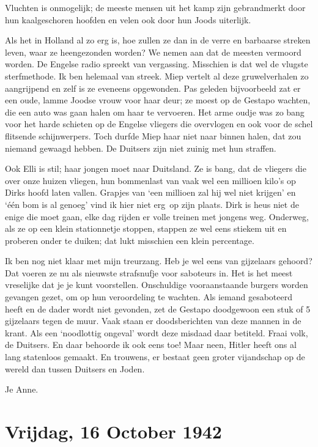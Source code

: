 \documentclass{book}
\begin{document}
Vluchten is onmogelijk; de meeste mensen uit het kamp zijn gebrandmerkt door hun
kaalgeschoren hoofden en velen ook door hun Joods uiterlijk.

Als het in Holland al zo erg is, hoe zullen ze dan in de verre en barbaarse
streken leven, waar ze heengezonden worden? We nemen aan dat de meesten vermoord
worden. De Engelse radio spreekt van vergassing.  Misschien is dat wel de
vlugste sterfmethode. Ik ben helemaal van streek. Miep vertelt al deze
gruwelverhalen zo aangrijpend en zelf is ze eveneens opgewonden. Pas geleden
bijvoorbeeld zat er een oude, lamme Joodse vrouw voor haar deur; ze moest op de
Gestapo wachten, die een auto was gaan halen om haar te vervoeren. Het arme
oudje was zo bang voor het harde schieten op de Engelse vliegers die overvlogen
en ook voor de schel flitsende schijnwerpers. Toch durfde Miep haar niet naar
binnen halen, dat zou niemand gewaagd hebben. De Duitsers zijn niet zuinig met
hun straffen.

Ook Elli is stil; haar jongen moet naar Duitsland. Ze is bang, dat de vliegers
die over onze huizen vliegen, hun bommenlast van vaak wel een millioen kilo's op
Dirks hoofd laten vallen. Grapjes van `een millioen zal hij wel niet krijgen' en
`één bom is al genoeg' vind ik hier niet erg~op zijn plaats. Dirk is heus niet
de enige die moet gaan, elke dag rijden er volle treinen met jongens weg.
Onderweg, als ze op een klein stationnetje stoppen, stappen ze wel eens stiekem
uit en proberen onder te duiken; dat lukt misschien een klein percentage.

Ik ben nog niet klaar met mijn treurzang. Heb je wel eens van gijzelaars
gehoord? Dat voeren ze nu als nieuwste strafsnufje voor saboteurs in.  Het is
het meest vreselijke dat je je kunt voorstellen. Onschuldige vooraanstaande
burgers worden gevangen gezet, om op hun veroordeling te wachten. Als iemand
gesaboteerd heeft en de dader wordt niet gevonden, zet de Gestapo doodgewoon een
stuk of 5 gijzelaars tegen de muur. Vaak staan er doodsberichten van deze mannen
in de krant. Als een `noodlottig ongeval' wordt deze misdaad daar betiteld.
Fraai volk, de Duitsers. En daar behoorde ik ook eens toe! Maar neen, Hitler
heeft ons al lang statenloos gemaakt. En trouwens, er bestaat geen groter
vijandschap op de wereld dan tussen Duitsers en Joden.

Je Anne.

\section*{Vrijdag, 16 October 1942}
\end{document}
